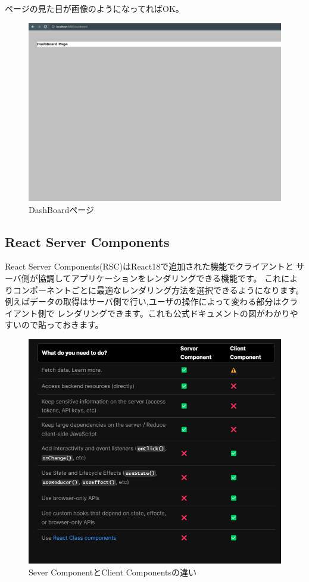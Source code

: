 ページの見た目が画像のようになってればOK。


\begin{figure}[H]
  \centering
  \includegraphics[width=12cm]{./image/03-Tech/chap4/03.png}
  \caption{DashBoardページ}
\end{figure}










\subsection{React Server Components}
React Server Components(RSC)はReact18で追加された機能でクライアントと
サーバ側が協調してアプリケーションをレンダリングできる機能です。
これによりコンポーネントごとに最適なレンダリング方法を選択できるようになります。
例えばデータの取得はサーバ側で行い,ユーザの操作によって変わる部分はクライアント側で
レンダリングできます。これも公式ドキュメントの図がわかりやすいので貼っておきます。


\begin{figure}[H]
  \centering
  \includegraphics[width=12cm]{./image/03-Tech/chap4/04.png}
  \caption{Sever ComponentとClient Componentsの違い}
\end{figure}



